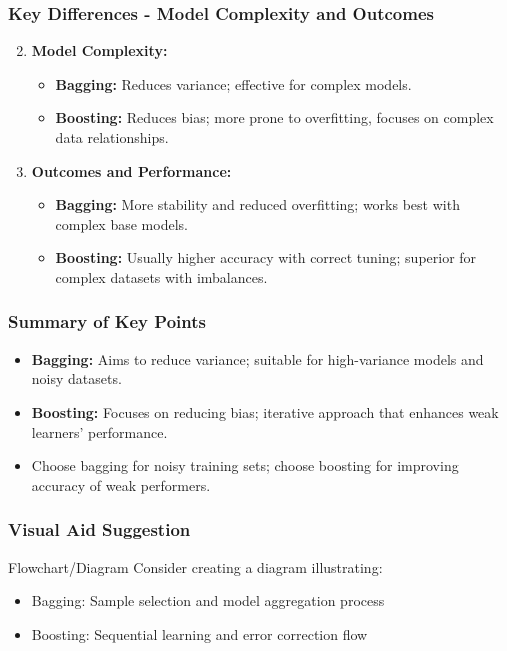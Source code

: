 \documentclass{beamer}
\begin{document}
\begin{frame}[fragile]
    \frametitle{Key Differences - Model Complexity and Outcomes}
    \begin{enumerate}
        \setcounter{enumi}{1}
        \item \textbf{Model Complexity:}
        \begin{itemize}
            \item \textbf{Bagging:} Reduces variance; effective for complex models.
            \item \textbf{Boosting:} Reduces bias; more prone to overfitting, focuses on complex data relationships.
        \end{itemize}
        
        \item \textbf{Outcomes and Performance:}
        \begin{itemize}
            \item \textbf{Bagging:} More stability and reduced overfitting; works best with complex base models.
            \item \textbf{Boosting:} Usually higher accuracy with correct tuning; superior for complex datasets with imbalances.
        \end{itemize}
    \end{enumerate}
\end{frame}

\begin{frame}[fragile]
    \frametitle{Summary of Key Points}
    \begin{itemize}
        \item \textbf{Bagging:} Aims to reduce variance; suitable for high-variance models and noisy datasets.
        \item \textbf{Boosting:} Focuses on reducing bias; iterative approach that enhances weak learners' performance.
        \item Choose bagging for noisy training sets; choose boosting for improving accuracy of weak performers.
    \end{itemize}
\end{frame}

\begin{frame}[fragile]
    \frametitle{Visual Aid Suggestion}
    \begin{block}{Flowchart/Diagram}
        Consider creating a diagram illustrating:
        \begin{itemize}
            \item Bagging: Sample selection and model aggregation process
            \item Boosting: Sequential learning and error correction flow
        \end{itemize}
    \end{block}
\end{frame}
\end{document}
